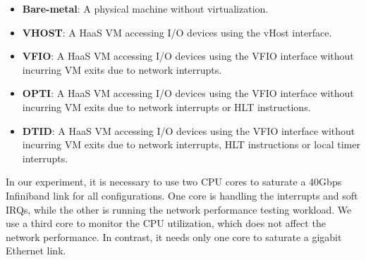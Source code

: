 \begin{itemize}
\setlength\itemsep{-0.04in}
  \item {\bf Bare-metal}: A physical machine without virtualization.
  
  \item {\bf VHOST}: A HaaS VM accessing I/O devices using the vHost interface.
  
  \item {\bf VFIO}: A HaaS VM accessing I/O devices using the VFIO interface without incurring VM exits due to network interrupts.
  
  \item {\bf OPTI}: A HaaS VM accessing I/O devices using the VFIO interface without incurring VM exits due to network interrupts or HLT instructions.  
  
  \item{\bf  DTID}: A HaaS VM accessing I/O devices using the VFIO interface without incurring VM exits due to network interrupts, HLT instructions or local timer interrupts.  
 
\end{itemize}




In our experiment, it is necessary to use two CPU cores to
saturate a 40Gbps Infiniband link for all configurations. One
core is handling the interrupts and soft IRQs, while the other
is running the network performance testing workload. We use a third
core to monitor the CPU utilization, which does not
affect the network performance. In contrast, it needs only one
core to saturate a gigabit Ethernet link.
